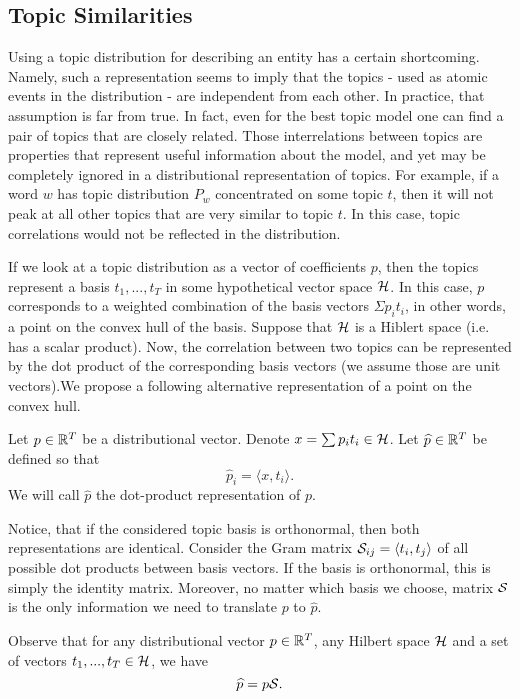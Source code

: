 \subsection{Topic Similarities}
Using a topic distribution for describing an entity has a certain
shortcoming. Namely, such a representation seems to imply that the
topics - used as atomic events in the distribution - are independent
from each other. In practice, that assumption is far from true. In
fact, even for the best topic model one can find a pair of topics that
are closely related. Those interrelations between topics are
properties that represent useful information about the model, and yet
may be completely ignored in a distributional representation of
topics. For example, if a word $w$ has topic distribution $P_w$
concentrated on some topic $t$, then it will 
not peak at all other topics that are very similar to
topic $t$. In this case, topic correlations would not be reflected in
the distribution. 

If we look at a topic distribution as a vector of coefficients $p$, then
the topics represent a basis $t_1,...,t_T$ in some hypothetical vector space ${\mathcal H}$. In
this case, $p$ corresponds to a weighted combination of the basis
vectors $\Sigma p_i t_i$, in other words, a point on the convex hull of the basis.
Suppose that ${\mathcal H}$ is a Hiblert space (i.e. has a scalar
product). Now, the correlation between two topics can be represented
by the dot product of the corresponding basis vectors (we assume those
are unit vectors).We propose a following alternative representation
of a point on the convex hull.

\bed
Let $p\in{\mathbb R}^T$ be a distributional vector. Denote $x=\sum p_i
t_i\in{\mathcal H}$. Let $\widehat{p}\in{\mathbb R}^T$ be defined so that
\[\widehat{p}_i = \langle x,t_i\rangle.\]
We will call $\widehat{p}$ the dot-product representation of $p$.
\eed

Notice, that if the considered topic basis is orthonormal, then both
representations are identical. Consider the Gram matrix
${\mathcal S}_{ij}=\langle t_i,t_j\rangle$ of all possible dot products between
basis vectors. If the basis is orthonormal, this is simply the identity
matrix. Moreover, no matter which basis we choose, matrix ${\mathcal S}$ is the
only information we need to translate $p$ to $\widehat{p}$.

\bep
Observe that for any distributional vector $p\in{\mathbb R}^T$, any Hilbert space ${\mathcal H}$ and a set of
vectors $t_1,...,t_T\in{\mathcal H}$, we have 
\[\widehat{p} = p{\mathcal S}.\]
\eep

